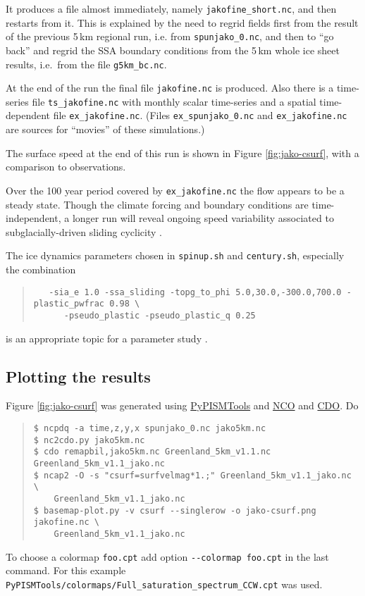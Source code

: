 It produces a file almost immediately, namely \verb|jakofine_short.nc|, and then restarts from it.  This is explained by the need to regrid fields first from the result of the previous 5\,km regional run, i.e. from \verb|spunjako_0.nc|, and then to ``go back'' and regrid the SSA boundary conditions from the 5\,km whole ice sheet results, i.e.~from the file \verb|g5km_bc.nc|.

At the end of the run the final file \verb|jakofine.nc| is produced.  Also there is a time-series file \verb|ts_jakofine.nc| with monthly scalar time-series and a spatial time-dependent file \verb|ex_jakofine.nc|.  (Files \verb|ex_spunjako_0.nc| and \verb|ex_jakofine.nc| are sources for ``movies'' of these simulations.)

The surface speed at the end of this run is shown in Figure \ref{fig:jako-csurf}, with a comparison to observations.

Over the 100 year period covered by \verb|ex_jakofine.nc| the flow appears to be a steady state.  Though the climate forcing and boundary conditions are time-independent, a longer run will reveal ongoing speed variability associated to subglacially-driven sliding cyclicity \cite{vanPeltOerlemans2012}.

The ice dynamics parameters chosen in \verb|spinup.sh| and \verb|century.sh|, especially the combination
\begin{quote}\small
\begin{verbatim}
   -sia_e 1.0 -ssa_sliding -topg_to_phi 5.0,30.0,-300.0,700.0 -plastic_pwfrac 0.98 \
      -pseudo_plastic -pseudo_plastic_q 0.25
\end{verbatim}
\normalsize\end{quote}
is an appropriate topic for a parameter study \cite{BKAJS}.


\subsection*{Plotting the results}

Figure \ref{fig:jako-csurf} was generated using \href{https://github.com/pism/PyPISMTools}{PyPISMTools} and \href{http://nco.sourceforge.net/}{NCO} and \href{http://code.zmaw.de/projects/cdo}{CDO}.  Do
\begin{quote}\small
\begin{verbatim}
$ ncpdq -a time,z,y,x spunjako_0.nc jako5km.nc
$ nc2cdo.py jako5km.nc
$ cdo remapbil,jako5km.nc Greenland_5km_v1.1.nc Greenland_5km_v1.1_jako.nc
$ ncap2 -O -s "csurf=surfvelmag*1.;" Greenland_5km_v1.1_jako.nc \
    Greenland_5km_v1.1_jako.nc
$ basemap-plot.py -v csurf --singlerow -o jako-csurf.png jakofine.nc \
    Greenland_5km_v1.1_jako.nc
\end{verbatim}
\normalsize\end{quote}
To choose a colormap \verb|foo.cpt| add option \verb|--colormap foo.cpt| in the last command. For this example \verb|PyPISMTools/colormaps/Full_saturation_spectrum_CCW.cpt| was used.

